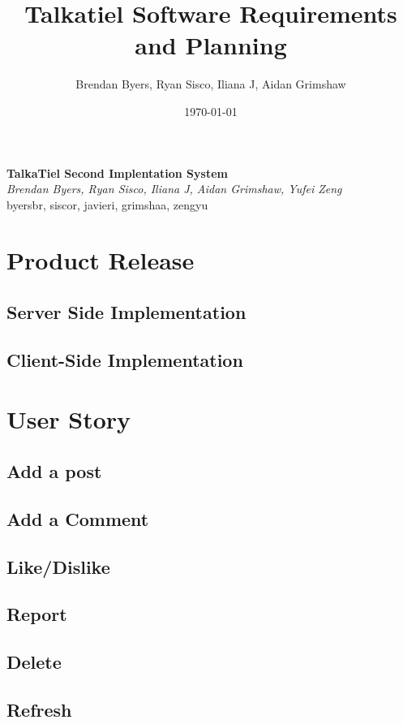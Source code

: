 \documentclass[12pt]{article}
\title{Talkatiel Software Requirements and Planning}
\author{Brendan Byers, Ryan Sisco, Iliana J, Aidan Grimshaw}
\date{\today}
\begin{document}
\begin{center}
      \Large\textbf{TalkaTiel Second Implentation System}\\
      \large\textit{Brendan Byers, Ryan Sisco, Iliana J, Aidan Grimshaw, Yufei Zeng}\\
      \large{byersbr, siscor, javieri, grimshaa, zengyu}\\
   \end{center}

\tableofcontents
\section{Product Release}
   \subsection{Server Side Implementation}

   \subsection{Client-Side Implementation}
\section{User Story}
      \subsection{Add a post}
      
      \subsection{Add a Comment}
      
      \subsection{Like/Dislike}
      
      \subsection{Report}
      
      \subsection{Delete}
      
      \subsection{Refresh}
      
\end{document}
